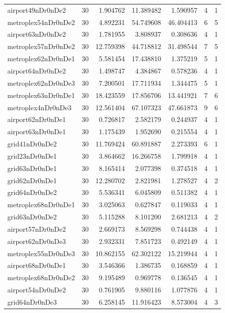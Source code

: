 \begin{longtable}{|l|r|r|r|r|r|r|}
airport49nDr0nDe2 & 30 & 1.904762 & 11.389482 & 1.590957 & 4 & 1 \\
metroplex54nDr0nDe2 & 30 & 4.892231 & 54.749608 & 46.404413 & 6 & 5 \\
airport63nDr0nDe2 & 30 & 1.781955 & 3.808937 & 0.308636 & 4 & 1 \\
metroplex57nDr0nDe2 & 30 & 12.759398 & 44.718812 & 31.498544 & 7 & 5 \\
metroplex62nDr0nDe1 & 30 & 5.581454 & 17.438810 & 1.375219 & 5 & 1 \\
airport64nDr0nDe2 & 30 & 1.498747 & 4.384867 & 0.578236 & 4 & 1 \\
metroplex62nDr0nDe3 & 30 & 7.200501 & 17.711934 & 1.344475 & 5 & 1 \\
metroplex63nDr0nDe1 & 30 & 18.423559 & 17.856706 & 13.441921 & 7 & 6 \\
metroplex4nDr0nDe3 & 30 & 12.561404 & 67.107323 & 47.661873 & 9 & 6 \\
airport62nDr0nDe1 & 30 & 0.726817 & 2.582179 & 0.244937 & 4 & 1 \\
airport63nDr0nDe1 & 30 & 1.175439 & 1.952690 & 0.215554 & 4 & 1 \\
grid41nDr0nDe2 & 30 & 11.769424 & 60.891887 & 2.273393 & 6 & 1 \\
grid23nDr0nDe1 & 30 & 3.864662 & 16.266758 & 1.799918 & 4 & 1 \\
grid63nDr0nDe1 & 30 & 8.165414 & 2.077398 & 0.374518 & 4 & 1 \\
grid62nDr0nDe1 & 30 & 12.280702 & 2.821981 & 1.278527 & 4 & 2 \\
grid64nDr0nDe2 & 30 & 5.536341 & 6.045809 & 0.511382 & 4 & 1 \\
metroplex68nDr0nDe1 & 30 & 3.025063 & 0.627847 & 0.119033 & 4 & 1 \\
grid63nDr0nDe2 & 30 & 5.115288 & 8.101200 & 2.681213 & 4 & 2 \\
airport57nDr0nDe2 & 30 & 2.669173 & 8.569298 & 0.744438 & 4 & 1 \\
airport62nDr0nDe3 & 30 & 2.932331 & 7.851723 & 0.492149 & 4 & 1 \\
metroplex55nDr0nDe3 & 30 & 10.862155 & 62.302122 & 15.219944 & 4 & 1 \\
airport68nDr0nDe1 & 30 & 3.546366 & 1.386735 & 0.168859 & 4 & 1 \\
metroplex68nDr0nDe2 & 30 & 9.195489 & 0.969778 & 0.136545 & 4 & 1 \\
airport54nDr0nDe2 & 30 & 0.761905 & 9.880116 & 1.077876 & 4 & 1 \\
grid64nDr0nDe3 & 30 & 6.258145 & 11.916423 & 8.573004 & 4 & 3 \\

\end{longtable}
